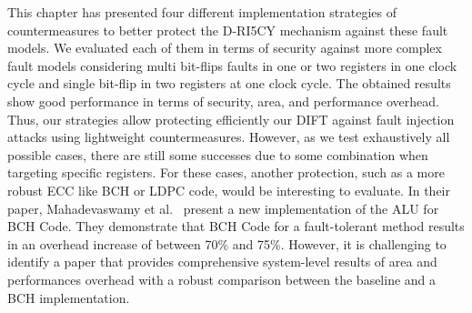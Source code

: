 This chapter has presented four different implementation strategies of countermeasures to better protect the D-RI5CY mechanism against these fault models. We evaluated each of them in terms of security against more complex fault models considering multi bit-flips faults in one or two registers in one clock cycle and single bit-flip in two registers at one clock cycle. The obtained results show good performance in terms of security, area, and performance overhead. Thus, our strategies allow protecting efficiently our DIFT against fault injection attacks using lightweight countermeasures. However, as we test exhaustively all possible cases, there are still some successes due to some combination when targeting specific registers. For these cases, another protection, such as a more robust ECC like BCH or LDPC code, would be interesting to evaluate. In their paper, Mahadevaswamy et al.~\cite{MSS-12-ijsce} present a new implementation of the ALU for BCH Code. They demonstrate that BCH Code for a fault-tolerant method results in an overhead increase of between 70\% and 75\%. However, it is challenging to identify a paper that provides comprehensive system-level results of area and performances overhead with a robust comparison between the baseline and a BCH implementation.

